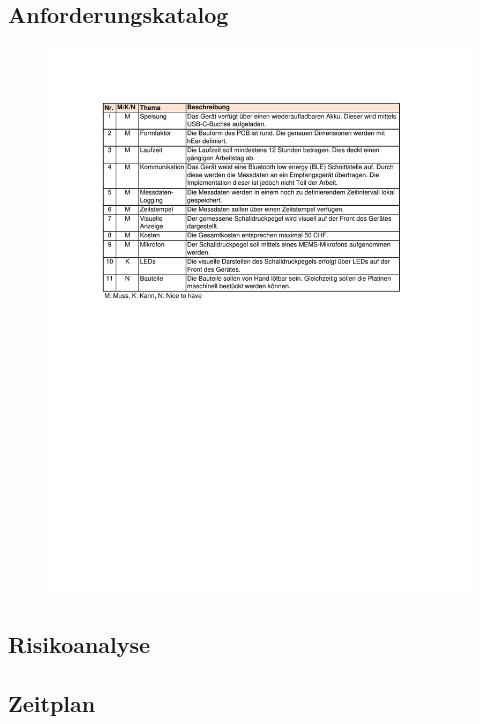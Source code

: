 \documentclass[12pt]{article}
\begin{document}
	\newpage
	\subsection*{Anforderungskatalog}\label{Anhang:Anforderungskatalog}
	\begin{figure}[H]
		\centering
		\includegraphics[trim= 2.5cm 5cm 0cm 3.5cm, width=1.2\linewidth]{images/BAT_Anforderungskatalog}
	\end{figure}
	
	\newpage
	\subsection*{Risikoanalyse}\label{Anhang:Risikoanalyse}
		\begin{minipage}[b]{\textwidth}
		
	\end{minipage}
	
	\newpage
	\subsection*{Zeitplan}\label{Anhang:Zeitplan}
	\begin{minipage}[b]{\textwidth}
		
	\end{minipage}
	
\end{document}

